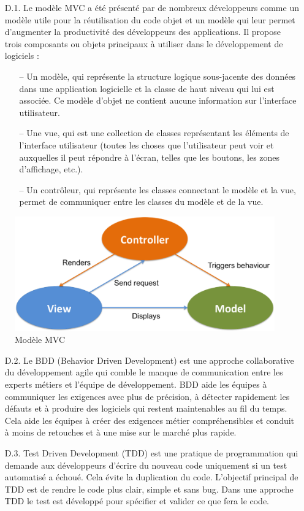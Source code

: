 \begin{itemize}
\item[D.1.] Le modèle MVC a été présenté par de nombreux développeurs comme un modèle utile pour la réutilisation du code objet et un modèle qui leur permet d’augmenter la productivité des développeurs des applications. Il propose trois composants ou objets principaux à utiliser dans le développement de logiciels :
    \begin{itemize}
    \item[--] Un modèle, qui représente la structure logique sous-jacente des données dans une application logicielle et la classe de haut niveau qui lui est associée. Ce modèle d'objet ne contient aucune information sur l'interface utilisateur.
    \item[--] Une vue, qui est une collection de classes représentant les éléments de l'interface utilisateur (toutes les choses que l'utilisateur peut voir et auxquelles il peut répondre à l'écran, telles que les boutons, les zones d'affichage, etc.).
    \item[--] Un contrôleur, qui représente les classes connectant le modèle et la vue, permet de communiquer entre les classes du modèle et de la vue.
    \end{itemize}
\end{itemize}
\begin{figure}[!ht]\centering
\includegraphics[scale=0.4]{mvc.png}
\caption{Modèle MVC \cite{mvc}}
\label{fig:fig1}
\end{figure}
\FloatBarrier
\begin{itemize}
\item[D.2.] Le BDD (Behavior Driven Development) est une approche collaborative du développement agile qui comble le manque de communication entre les experts métiers et l’équipe de développement. BDD aide les équipes à communiquer les exigences avec plus de précision, à détecter rapidement les défauts et à produire des logiciels qui restent maintenables au fil du temps. Cela aide les équipes à créer des exigences métier compréhensibles et conduit à moins de retouches et à une mise sur le marché plus rapide.
\item[D.3.] Test Driven Development (TDD) est une pratique de programmation qui demande aux développeurs d'écrire du nouveau code uniquement si un test automatisé a échoué. Cela évite la duplication du code. L’objectif principal de TDD est de rendre le code plus clair, simple et sans bug. Dans une approche TDD le test est développé pour spécifier et valider ce que fera le code.
\end{itemize}
